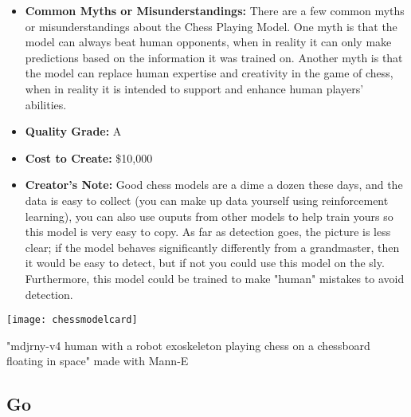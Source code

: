 \begin{itemize}
    \item \textbf{Common Myths or Misunderstandings:} There are a few common myths or misunderstandings about the Chess Playing Model. One myth is that the model can always beat human opponents, when in reality it can only make predictions based on the information it was trained on. Another myth is that the model can replace human expertise and creativity in the game of chess, when in reality it is intended to support and enhance human players' abilities. 
    \item \textbf{Quality Grade:} A
    \item \textbf{Cost to Create:} \$10,000
    \item \textbf{Creator's Note:} Good chess models are a dime a dozen these days, and the data is easy to collect (you can make up data yourself using reinforcement learning), you can also use ouputs from other models to help train yours so this model is very easy to copy. As far as detection goes, the picture is less clear; if the model behaves significantly differently from a grandmaster, then it would be easy to detect, but if not you could use this model on the sly. Furthermore, this model could be trained to make "human" mistakes to avoid detection. 
\end{itemize}

\begin{marginfigure}[-5.5cm]
        \texttt{[image: chessmodelcard]}
        \caption{"mdjrny-v4 human with a robot exoskeleton playing chess on a chessboard floating in space" made with Mann-E}
\end{marginfigure}

\subsection{Go}

